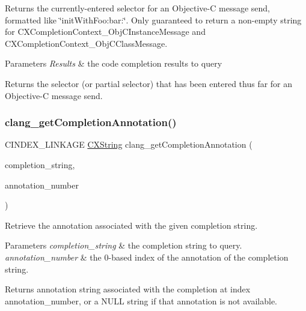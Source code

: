 Returns the currently-\/entered selector for an Objective-\/C message send, formatted like \char`\"{}init\+With\+Foo\+:bar\+:\char`\"{}. Only guaranteed to return a non-\/empty string for C\+X\+Completion\+Context\+\_\+\+Obj\+C\+Instance\+Message and C\+X\+Completion\+Context\+\_\+\+Obj\+C\+Class\+Message. 


\begin{DoxyParams}{Parameters}
{\em Results} & the code completion results to query\\
\hline
\end{DoxyParams}
\begin{DoxyReturn}{Returns}
the selector (or partial selector) that has been entered thus far for an Objective-\/C message send. 
\end{DoxyReturn}
\mbox{\label{group__CINDEX__CODE__COMPLET_ga5a6995822b664926ac3d919d69e736ce}} 
\subsubsection{\texorpdfstring{clang\+\_\+get\+Completion\+Annotation()}{clang\_getCompletionAnnotation()}}
{\footnotesize\ttfamily C\+I\+N\+D\+E\+X\+\_\+\+L\+I\+N\+K\+A\+GE \mbox{\hyperlink{structCXString}{C\+X\+String}} clang\+\_\+get\+Completion\+Annotation (\begin{DoxyParamCaption}\item[{\mbox{\hyperlink{group__CINDEX__CODE__COMPLET_gafea23a43a60ec3b4f3bedccfbb76883a}{C\+X\+Completion\+String}}}]{completion\+\_\+string,  }\item[{unsigned}]{annotation\+\_\+number }\end{DoxyParamCaption})}



Retrieve the annotation associated with the given completion string. 


\begin{DoxyParams}{Parameters}
{\em completion\+\_\+string} & the completion string to query.\\
\hline
{\em annotation\+\_\+number} & the 0-\/based index of the annotation of the completion string.\\
\hline
\end{DoxyParams}
\begin{DoxyReturn}{Returns}
annotation string associated with the completion at index {\ttfamily annotation\+\_\+number}, or a N\+U\+LL string if that annotation is not available. 
\end{DoxyReturn}
\mbox{\label{group__CINDEX__CODE__COMPLET_gacbbded5dd9c27b927ed5080d8b530845}} 
